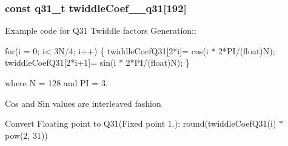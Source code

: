 \subsubsection[{\texorpdfstring{twiddle\+Coef\+\_\+128\+\_\+q31}{twiddleCoef_128_q31}}]{\setlength{\rightskip}{0pt plus 5cm}const q31\+\_\+t twiddle\+Coef\+\_\+\_\+q31\mbox{[}192\mbox{]}}\hypertarget{group__CFFT__CIFFT_gafecf9ed9873415d9f5f17f37b30c7250}{}\label{group__CFFT__CIFFT_gafecf9ed9873415d9f5f17f37b30c7250}
\begin{DoxyParagraph}{}
Example code for Q31 Twiddle factors Generation\+:\+: 
\end{DoxyParagraph}
\begin{DoxyParagraph}{}

\begin{DoxyPre}for(i = 0; i< 3N/4; i++)
\{
   twiddleCoefQ31[2*i]= cos(i * 2*PI/(float)N);
   twiddleCoefQ31[2*i+1]= sin(i * 2*PI/(float)N);
\} \end{DoxyPre}
 
\end{DoxyParagraph}
\begin{DoxyParagraph}{}
where N = 128 and PI = 3. 
\end{DoxyParagraph}
\begin{DoxyParagraph}{}
Cos and Sin values are interleaved fashion 
\end{DoxyParagraph}
\begin{DoxyParagraph}{}
Convert Floating point to Q31(Fixed point 1.)\+: round(twiddle\+Coef\+Q31(i) $\ast$ pow(2, 31)) 
\end{DoxyParagraph}
